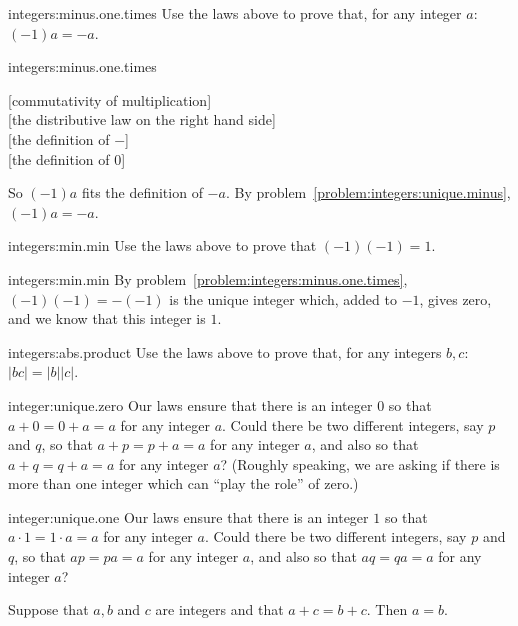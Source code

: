 \begin{problem}{integers:minus.one.times}
Use the laws above to prove that, for any integer \(a\): \((-1)a=-a\).
\end{problem}
\begin{answer}{integers:minus.one.times}
\begin{twocolumnproof}
[commutativity of multiplication] \\
[the distributive law on the right hand side] \\
[the definition of \(-\)] \\
[the definition of \(0\)] 
\end{twocolumnproof}
So \((-1)a\) fits the definition of \(-a\).
By problem~\vref{problem:integers:unique.minus}, \((-1)a=-a\).
\end{answer}
\begin{problem}{integers:min.min}
Use the laws above to prove that \((-1)(-1)=1\).
\end{problem}
\begin{answer}{integers:min.min}
By problem~\vref{problem:integers:minus.one.times}, \((-1)(-1)=-(-1)\) is the unique integer which, added to \(-1\), gives zero, and we know that this integer is \(1\).
\end{answer}
\begin{problem}{integers:abs.product}
Use the laws above to prove that, for any integers \(b,c\): \(|bc|=|b||c|\).
\end{problem}
\begin{problem}{integer:unique.zero}
Our laws ensure that there is an integer \(0\) so that \(a+0=0+a=a\) for any integer \(a\).
Could there be two different integers, say \(p\) and \(q\), so that \(a+p=p+a=a\) for any integer \(a\), and also so that \(a+q=q+a=a\) for any integer \(a\)?
(Roughly speaking, we are asking if there is more than one integer which can ``play the role'' of zero.)
\end{problem}
\begin{problem}{integer:unique.one}
Our laws ensure that there is an integer \(1\) so that \(a \cdot 1=1 \cdot a=a\) for any integer \(a\).
Could there be two different integers, say \(p\) and \(q\), so that \(ap=pa=a\) for any integer \(a\), and also so that \(aq=qa=a\) for any integer \(a\)?
\end{problem}
\begin{theorem}
Suppose that \(a, b\) and \(c\) are integers and that \(a+c=b+c\).
Then \(a=b\).
\end{theorem}
